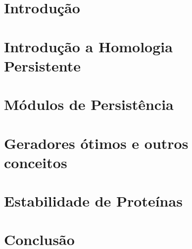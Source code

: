 \documentclass[mestrado, pre-defesa]{packages/icmc}
\begin{document}
\textual

\chapter{Introdução}
\label{chapter:introducao}


\chapter{Introdução a Homologia Persistente}
\label{chapter:hp101}


\chapter{Módulos de Persistência}
\label{chapter:mph}


\chapter{Geradores ótimos e outros conceitos}
\label{chapter:miscel}


\chapter{Estabilidade de Proteínas}
\label{chapter:aplicacoes}


\chapter{Conclusão}
\label{chapter:conclusao}



%

\postextual



\end{document}
